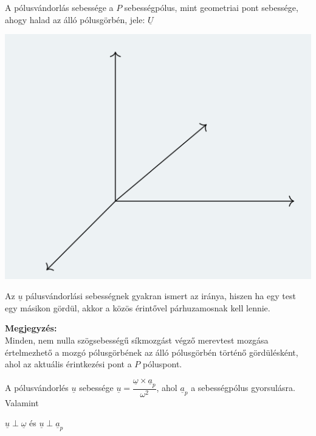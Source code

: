 \begin{tcolorbox}[colback=MidnightBlue!5!white,colframe=MidnightBlue!60!black,title= Definíció]
    A pólusvándorlás sebessége a \(P\) sebességpólus, mint geometriai pont sebessége, ahogy halad az álló pólusgörbén, jele: \(\underline{U}\)
    \begin{center}
        \includegraphics[scale = 0.7]{Ea_gyak_1/2.png}
    \end{center}
    Az \(\underline{u}\) pálusvándorlási sebességnek gyakran ismert az iránya, hiszen ha egy test egy másikon gördül, akkor a közös érintővel párhuzamosnak kell lennie.
\end{tcolorbox}

\textbf{Megjegyzés:}\\
Minden, nem nulla szögsebességű síkmozgást végző merevtest mozgása értelmezhető a mozgó pólusgörbének az álló pólusgörbén történő gördülésként, ahol az aktuális érintkezési pont a \(P\) póluspont.

\begin{tcolorbox}[colback=MidnightBlue!5!white,colframe=MidnightBlue!60!black,title= Tétel]
A pólusvándorlés \(\underline{u}\) sebessége \(\underline{u} = \dfrac{\underline{\omega} \times \underline{a}_p}{\omega^2}\), ahol \(\underline{a}_p\) a sebességpólus gyorsulásra. Valamint
\begin{center}
    \(\underline{u} \perp \underline{\omega}\) és \(\underline{u} \perp \underline{a}_p\)
\end{center}
\end{tcolorbox}



